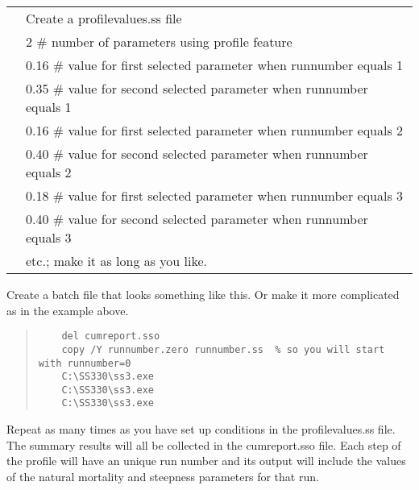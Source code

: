 	\begin{longtable}{p{0.5cm} p{16cm}}		
		& Create a profilevalues.ss file \\
		& 2	\# number of parameters using profile feature \\
		& 0.16	\# value for first selected parameter when runnumber equals 1 \\
		& 0.35	\# value for second selected parameter when runnumber equals 1 \\
		& 0.16	\# value for first selected parameter when runnumber equals 2 \\
		& 0.40	\# value for second selected parameter when runnumber equals 2 \\
		& 0.18	\# value for first selected parameter when runnumber equals 3 \\
		& 0.40	\# value for second selected parameter when runnumber equals 3 \\
		& etc.;  make it as long as you like. \\
	\end{longtable}

Create a batch file that looks something like this. Or make it more complicated as in the example above.


\begin{quote}
\begin{verbatim}
	del cumreport.sso
	copy /Y runnumber.zero runnumber.ss  % so you will start with runnumber=0 
	C:\SS330\ss3.exe 
	C:\SS330\ss3.exe 
	C:\SS330\ss3.exe 
\end{verbatim}
\end{quote}


Repeat as many times as you have set up conditions in the profilevalues.ss file.
The summary results will all be collected in the cumreport.sso file.  Each step of the profile will have an unique run number and its output will include the values of the natural mortality and steepness parameters for that run.

